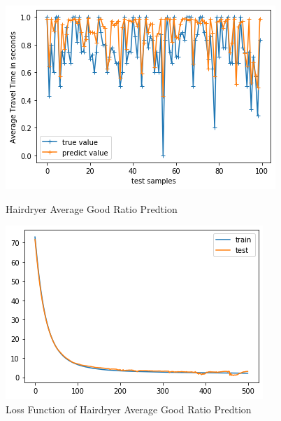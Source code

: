 \documentclass[12pt]{article}
\begin{document}
\begin{figure}[!htb]
   \begin{minipage}{0.48\textwidth}
     \centering
     \includegraphics[width=.8\linewidth]{hairratio_RMSE0131.png} %
     \caption{Hairdryer Average Good Ratio Predtion}\label{hairgr}
   \end{minipage}\hfill
   \begin{minipage}{0.48\textwidth}
     \centering
     \includegraphics[width=.8\linewidth]{microloss.png}
     \caption{Loss Function of Hairdryer Average Good Ratio Predtion}\label{hairgrloss}
   \end{minipage}
\end{figure} 
\end{document}
